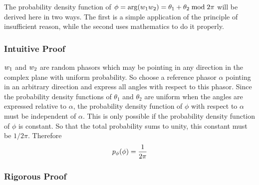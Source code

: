 The probability density function of $\phi=\arg({w_1}{w_2})=\theta_1+\theta_2\bmod2\pi$ will be derived
here in two ways.  The first is a simple application of the principle
of insufficient reason, while the second uses mathematics to do it properly.

\subsubsection{Intuitive Proof}

${w_1}$ and ${w_2}$ are random phasors which may be pointing in any direction
in the complex plane with uniform probability.  So choose a reference phasor
$\alpha$ pointing in an arbitrary direction and express all angles with
respect to this phasor.  Since the probability density functions of $\theta_1$ and $\theta_2$ are 
uniform when the angles are expressed relative to $\alpha$, the probability density function of 
$\phi$ with respect to $\alpha$ must be independent of $\alpha$. This is only
possible if the probability density function of $\phi$ is constant.  So that the total probability
sums to unity, this constant must be $1/2\pi$.  Therefore
\begin{equation}
{p}_{\phi}(\phi)=\frac{1}{2\pi}
\end{equation}


\subsubsection{Rigorous Proof}


